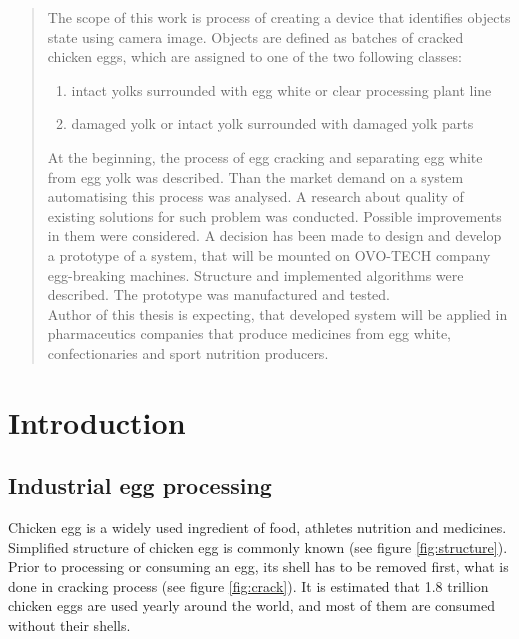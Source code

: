 \documentclass[12pt,twoside,a4paper]{article}
\begin{document}
\begin{abstract}
The scope of this work is process of creating a device that identifies objects state using camera image. Objects are defined as batches of cracked chicken eggs, which are assigned to one of the two following classes:
\begin{enumerate}
\item intact yolks surrounded with egg white or clear processing plant line
\item damaged yolk or intact yolk surrounded with damaged yolk parts
\end{enumerate}
At the beginning, the process of egg cracking and separating egg white from egg yolk was described. Than the market demand on a system automatising this process was analysed.
A research about quality of existing solutions for such problem was conducted. Possible improvements in them were considered.
A decision has been made to design and develop a prototype of a system, that will be mounted on OVO-TECH company egg-breaking machines.
Structure and implemented algorithms were described. The prototype was manufactured and tested.\\
Author of this thesis is expecting, that developed system will be applied in pharmaceutics companies that produce medicines from egg white, confectionaries and sport nutrition producers.

\end{abstract}
\newpage 
\tableofcontents


\section{Introduction}
\subsection{Industrial egg processing}
Chicken egg is a widely used ingredient of food, athletes nutrition and medicines. Simplified structure of chicken egg is commonly known (see figure \ref{fig:structure}). Prior to processing or consuming an egg, its shell has to be removed first, what is done in cracking process (see figure \ref{fig:crack}). It is estimated that 1.8 trillion chicken eggs are used yearly around the world\cite{trillion}, and most of them are consumed without their shells. 
\end{document}
